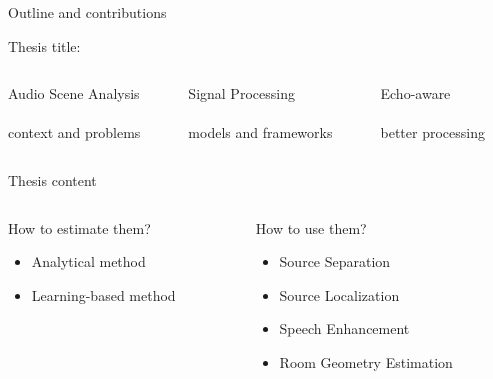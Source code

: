 \begin{frame}{Outline and contributions}

    \begin{block}{Thesis title:}

        \vspace*{2mm}
        \begin{columns}[onlytextwidth]
            \begin{column}[T]{0.3\linewidth}
                \centering
                \alert{Audio Scene Analysis}
                \\\downarrow
                \\context and problems
            \end{column}\hfill\pause
            \begin{column}[T]{0.3\linewidth}
                \centering
                \alert{Signal Processing}
                \\\downarrow
                \\models and frameworks
            \end{column}\hfill\pause
            \begin{column}[T]{0.3\linewidth}
                \centering
                \alert{Echo-aware}
                \\\downarrow
                \\better processing
            \end{column}\hfill
        \end{columns}
    \end{block}
    \pause

    \vfill
    \begin{block}{Thesis content}

        \vspace*{2mm}
        \begin{columns}[T,onlytextwidth]
        \begin{column}{0.48\textwidth}
            \centering
            \alert{How to estimate them?}
            \begin{itemize}
                \item Analytical method
                \item Learning-based method
            \end{itemize}
        \end{column}
        \begin{column}{0.48\textwidth}
            \centering
            \alert{How to use them?}
            \begin{itemize}
                \item Source Separation
                \item Source Localization
                \item Speech Enhancement
                \item Room Geometry Estimation
            \end{itemize}
        \end{column}
    \end{columns}


\end{block}
\end{frame}

